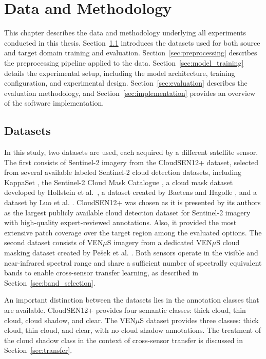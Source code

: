\chapter{Data and Methodology} \label{chap:methodology}


This chapter describes the data and methodology underlying all experiments conducted in this thesis. Section~\ref{sec:datasets} introduces the datasets used for both source and target domain training and evaluation. Section~\ref{sec:preprocessing} describes the preprocessing pipeline applied to the data. Section~\ref{sec:model_training} details the experimental setup, including the model architecture, training configuration, and experimental design. Section~\ref{sec:evaluation} describes the evaluation methodology, and Section~\ref{sec:implementation} provides an overview of the software implementation.

\section{Datasets}
\label{sec:datasets} 

In this study, two datasets are used, each acquired by a different satellite sensor. The first consists of Sentinel-2 imagery from the CloudSEN12+ dataset, selected from several available labeled Sentinel-2 cloud detection datasets, including KappaSet \cite{kappaset2022}, the Sentinel-2 Cloud Mask Catalogue \cite{s2cloudmask}, a cloud mask dataset developed by Hollstein et al.\ \cite{hollstein2016}, a dataset created by Baetens and Hagolle \cite{baetens2018}, and a dataset by Luo et al. \cite{luo2024}. CloudSEN12+ \cite{aybar2024} was chosen as it is presented by its authors as the largest publicly available cloud detection dataset for Sentinel-2 imagery with high-quality expert-reviewed annotations. Also, it provided the most extensive patch coverage over the target region among the evaluated options. The second dataset consists of VEN$\mu$S imagery from a dedicated VEN$\mu$S cloud masking dataset created by Pešek et al. \cite{pesek2022}. Both sensors operate in the visible and near-infrared spectral range and share a sufficient number of spectrally equivalent bands to enable cross-sensor transfer learning, as described in Section~\ref{sec:band_selection}.

An important distinction between the datasets lies in the annotation classes that are available. CloudSEN12+ provides four semantic classes: thick cloud, thin cloud, cloud shadow, and clear. The VEN$\mu$S dataset provides three classes: thick cloud, thin cloud, and clear, with no cloud shadow annotations. The treatment of the cloud shadow class in the context of cross-sensor transfer is discussed in Section~\ref{sec:transfer}.

